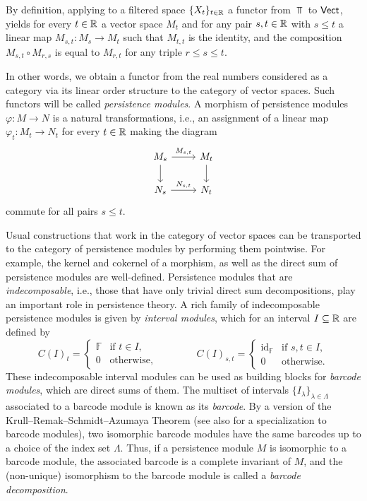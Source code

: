 By definition, applying to a filtered space $\{X_t\}_{t \in \mathbb{R}}$ a functor from $\Top$ to $\mathsf{Vect}$, yields for every $t \in \mathbb{R}$ a vector space $M_t$ and for any pair $s, t \in \mathbb{R}$ with $s \leq t$ a linear map $M_{s,t} \colon M_s \to M_t$ such that $M_{t,t}$ is the identity, and the composition $M_{s,t} \circ M_{r,s}$ is equal to $M_{r,t}$ for any triple $r \leq s \leq t$.

In other words, we obtain a functor from the real numbers considered as a category via its linear order structure to the category of vector spaces.
Such functors will be called \emph{persistence modules}.
A morphism of persistence modules $\varphi \colon M \to N$ is a natural transformations, i.e., an assignment of a linear map $\varphi_t \colon M_t \to N_t$ for every $t \in \mathbb{R}$ making the diagram
\begin{equation*}
    \begin{tikzcd}
    M_{s} \arrow[r, "M_{s,t}"] \arrow[d] & M_{t} \arrow[d] \\
    N_{s} \arrow[r, "N_{s,t}"] & N_{t}
    \end{tikzcd}
\end{equation*}
commute for all pairs $s \leq t$.

Usual constructions that work in the category of vector spaces can be transported to the category of persistence modules by performing them pointwise.
For example, the kernel and cokernel of a morphism, as well as the direct sum of persistence modules are well-defined.
Persistence modules that are \emph{indecomposable}, i.e., those that have only trivial direct sum decompositions, play an important role in persistence theory.
A rich family of indecomposable persistence modules is given by \emph{interval modules}, which for an interval $I \subseteq \mathbb{R}$ are defined by
\begin{equation} \label{e:interval module}
    C(I)_t =
    \begin{cases}
        \mathbb{F} & \text{if } t \in I, \\
        0          & \text{otherwise},
    \end{cases}
    \qquad
    \qquad
    C(I)_{s, t} =
    \begin{cases}
        \operatorname{id}_{\mathbb{F}} & \text{if } s, t \in I,\\
        0 & \text{otherwise}.
    \end{cases}    
\end{equation}
These indecomposable interval modules can be used as building blocks for \emph{barcode modules}, which are direct sums of them.
The multiset of intervals $\{I_{\lambda}\}_{\lambda \in \Lambda}$ associated to a barcode module is known as its \textit{barcode}. By a version of the Krull--Remak--Schmidt--Azumaya Theorem \cite{MR37832} (see also \cite[Theorem 2.7]{Chazal.2016a} for a specialization to barcode modules), two isomorphic barcode modules have the same barcodes up to a choice of the index set $\Lambda$. Thus, if a persistence module $M$ is isomorphic to a barcode module, the associated barcode is a complete invariant of $M$, and the (non-unique) isomorphism to the barcode module is called a \emph{barcode decomposition}.


